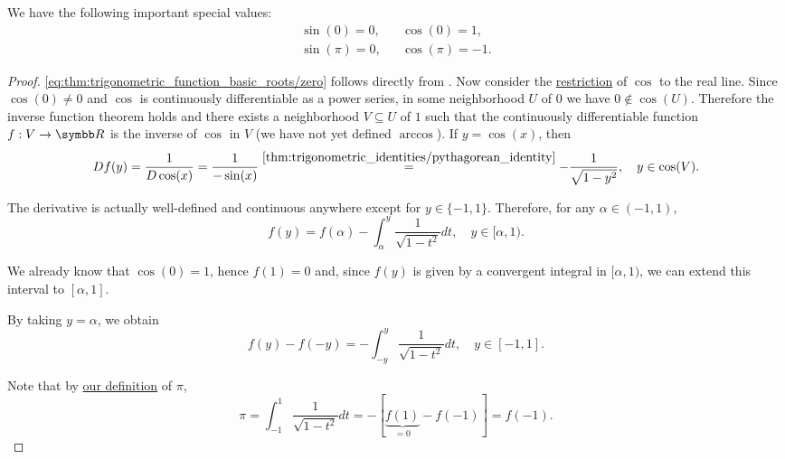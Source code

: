 \begin{lemma}\label{thm:trigonometric_function_basic_roots}
  We have the following important special values:
  \begin{align}
    \sin(0) = 0,   &  & \cos(0) = 1,    \label{eq:thm:trigonometric_function_basic_roots/zero} \\
    \sin(\pi) = 0, &  & \cos(\pi) = -1. \label{eq:thm:trigonometric_function_basic_roots/pi}
  \end{align}
\end{lemma}
\begin{proof}
\eqref{eq:thm:trigonometric_function_basic_roots/zero} follows directly from .
  Now consider the \hyperref[def:function/extension]{restriction} of \( \cos \) to the real line. Since \( \cos(0) \neq 0 \) and \( \cos \) is continuously differentiable as a power series, in some neighborhood \( U \) of \( 0 \) we have \( 0 \not\in \cos(U) \). Therefore the inverse function theorem holds and there exists a neighborhood \( V \subseteq U \) of \( 1 \) such that the continuously differentiable function \( f: V \to \BR \) is the inverse of \( \cos \) in \( V \) (we have not yet defined \hyperref[def:inverse_trigonometric_functions/arccos]{\( \arccos \)}). If \( y = \cos(x) \), then
  \begin{equation*}
    Df(y)
    =
    \frac 1 {D\cos(x)}
    =
    \frac 1 {-\sin(x)}
    \overset {\ref{thm:trigonometric_identities/pythagorean_identity}} =
    -\frac 1 {\sqrt{1 - y^2}},
    \quad y \in \cos(V).
  \end{equation*}

  The derivative is actually well-defined and continuous anywhere except for \( y \in \{ -1, 1 \} \). Therefore, for any \( \alpha \in (-1, 1) \),
  \begin{equation*}
    f(y) = f(\alpha) - \int_{\alpha}^y \frac 1 {\sqrt{1 - t^2}} dt, \quad y \in [\alpha, 1).
  \end{equation*}

  We already know that \( \cos(0) = 1 \), hence \( f(1) = 0 \) and, since \( f(y) \) is given by a convergent integral in \( [\alpha, 1) \), we can extend this interval to \( [\alpha, 1] \).

  By taking \( y = \alpha \), we obtain
  \begin{equation*}
    f(y) - f(-y) = -\int_{-y}^y \frac 1 {\sqrt{1 - t^2}} dt, \quad y \in [-1, 1].
  \end{equation*}

  Note that by \hyperref[def:pi]{our definition} of \( \pi \),
  \begin{equation*}
    \pi
    =
    \int_{-1}^1 \frac 1 {\sqrt{1 - t^2}} dt
    =
    -[\underbrace{f(1)}_{=0} - f(-1)]
    =
    f(-1).
  \end{equation*}


\end{proof}
